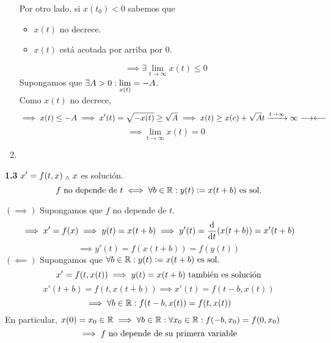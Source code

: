 \begin{enumerate}
	Por otro lado, si $x(t_0)<0$ sabemos que
	\begin{itemize}
		\item $x(t)$ no decrece.
		\item $x(t)$ está acotada por arriba por 0.
	\end{itemize}
	\[\implies \exists \lim_{t\to \infty} x(t) \leq 0\]
	Supongamos que $\displaystyle \exists A > 0 : \lim_{x(t)} = -A$. \\
	Como $x(t)$ no decrece,
	\[\displaystyle \implies x(t) \leq -A \implies x'(t) = \sqrt{-x(t)}\geq \sqrt{A} \implies x(t)\geq x(c) + \sqrt{A}t \xrightarrow{t\to \infty} \infty \longrightarrow\longleftarrow\]
	\[\implies \lim_{t\to \infty} x(t) =0 \]
	\item
\end{enumerate}

\textbf{1.3} $\displaystyle x' = f(t,x) \; _{\wedge} \; x$ es solución.
\[f\text{ no depende de } t \iff \forall b \in \mathbb{R} : y(t)\vcentcolon= x(t+b) \text{ es sol.}\]
\begin{dem}
	$(\implies)$ Supongamos que $f$ no depende de $t$.
	\[\implies x'=f(x) \implies y(t)=x(t+b)\implies y'(t)=\odv{}{t} (x(t+b)) = x'(t+b)\]
	\[\implies y'(t)=f(x(t+b))=f(y(t))\]
	$(\impliedby)$ Supongamos que $\forall b \in \mathbb{R} : y(t)\vcentcolon= x(t+b) \text{ es sol.}$
	\[x'=f(t, x(t)) \implies y(t)=x(t+b) \text{ también es solución}\]
	\[x'(t+b)=f(t, x(t+b)) \implies x'(t) = f(t-b, x(t))\]
	\[\implies \forall b \in \mathbb{R} : f(t-b, x(t))=f(t, x(t))\]
	En particular, $x(0)=x_0 \in \mathbb{R} \implies \forall b \in \mathbb{R} : \forall x_0 \in \mathbb{R} : f(-b,x_0)=f(0,x_0)$
	\[\implies f\text{ no depende de su primera variable}\]
\end{dem}